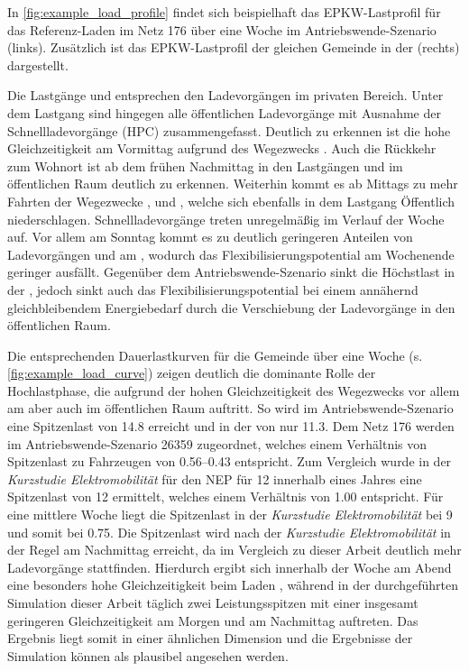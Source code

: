 

In \autoref{fig:example_load_profile} findet sich beispielhaft das \gls{EPKW}-Lastprofil für das Referenz-Laden im Netz \num{176} über eine Woche im Antriebswende-Szenario (links).
Zusätzlich ist das \gls{EPKW}-Lastprofil der gleichen Gemeinde in der \SzeFirmenparkplatz (rechts) dargestellt.



Die Lastgänge \zH und \Firmeparkplatz entsprechen den Ladevorgängen im privaten Bereich.
Unter dem Lastgang \oeffen sind hingegen alle öffentlichen Ladevorgänge mit Ausnahme der Schnellladevorgänge (\gls{HPC}) zusammengefasst.
Deutlich zu erkennen ist die hohe Gleichzeitigkeit am Vormittag aufgrund des Wegezwecks \Arbeitdot.
Auch die Rückkehr zum Wohnort ist ab dem frühen Nachmittag in den Lastgängen \zH und im öffentlichen Raum deutlich zu erkennen.
Weiterhin kommt es ab Mittags zu mehr Fahrten der Wegezwecke \Einkaufdot, \Erledigung und \Freizeitdot, welche sich ebenfalls in dem Lastgang \glqq Öffentlich\grqq{} niederschlagen.
Schnellladevorgänge treten unregelmäßig im Verlauf der Woche auf.
Vor allem am Sonntag kommt es zu deutlich geringeren Anteilen von Ladevorgängen \zH und am \Firmeparkplatzdot, wodurch das Flexibilisierungspotential am Wochenende geringer ausfällt.
Gegenüber dem Antriebswende-Szenario sinkt die Höchstlast in der \SzeFirmenparkplatzdot, jedoch sinkt auch das Flexibilisierungspotential bei einem annähernd gleichbleibendem Energiebedarf durch die Verschiebung der Ladevorgänge in den öffentlichen Raum.\medskip

Die entsprechenden Dauerlastkurven für die Gemeinde über eine Woche (s. \autoref{fig:example_load_curve}) zeigen deutlich die dominante Rolle der Hochlastphase, die aufgrund der hohen Gleichzeitigkeit des Wegezwecks \Arbeit vor allem am \Firmeparkplatz aber auch im öffentlichen Raum auftritt.
So wird im Antriebswende-Szenario eine Spitzenlast von \SI{14.8}{\mw} erreicht und in der \SzeFirmenparkplatz von nur \SI{11.3}{\mw}.
Dem Netz \num{176} werden im Antriebswende-Szenario \SI{26359}{\FZ} zugeordnet, welches einem Verhältnis von Spitzenlast zu Fahrzeugen von \SIrange[range-phrase=~bzw.~]{0.56}{0.43}{\kWperFZ} entspricht.
Zum Vergleich wurde in der \textit{Kurzstudie Elektromobilität} für den \gls{NEP} \cite{Ebner2019} für \SI{12}{\MioStk} innerhalb eines Jahres eine Spitzenlast von \SI{12}{\gw} ermittelt, welches einem Verhältnis von \SI{1.00}{\kWperFZ} entspricht.
Für eine mittlere Woche liegt die Spitzenlast in der \textit{Kurzstudie Elektromobilität} bei \SI{9}{\gw} und somit bei \SI{0.75}{\kWperFZ}.
Die Spitzenlast wird nach der \textit{Kurzstudie Elektromobilität} in der Regel am Nachmittag erreicht, da im Vergleich zu dieser Arbeit deutlich mehr Ladevorgänge \zH stattfinden.
Hierdurch ergibt sich innerhalb der Woche am Abend eine besonders hohe Gleichzeitigkeit beim Laden \zHdot, während in der durchgeführten Simulation dieser Arbeit täglich zwei Leistungsspitzen mit einer insgesamt geringeren Gleichzeitigkeit am Morgen und am Nachmittag auftreten.
Das Ergebnis liegt somit in einer ähnlichen Dimension und die Ergebnisse der Simulation können als plausibel angesehen werden.


